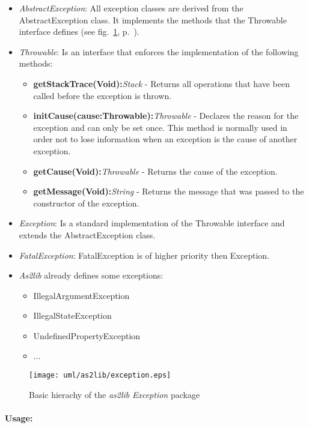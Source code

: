 \begin{itemize}
	\item \emph{AbstractException}: All exception classes are derived from the AbstractException class. It implements the methods that the Throwable interface defines (see fig.\ \ref{fig:exception}, p.\ \pageref{fig:exception}).
	\item \emph{Throwable}: Is an interface that enforces the implementation of the following methods:
		\begin{itemize}
			\item \textbf{getStackTrace(Void):}\textit{Stack} - Returns all operations that have been called before the exception is thrown.
			\item \textbf{initCause(cause:Throwable):}\textit{Throwable} - Declares the reason for the exception and can only be set once. This method is normally used in order not to lose information when an exception is the cause of another exception.
			\item \textbf{getCause(Void):}\textit{Throwable} - Returns the cause of the exception.
			\item \textbf{getMessage(Void):}\textit{String} - Returns the message that was passed to the constructor of the exception.
		\end{itemize}
	\item \emph{Exception}: Is a standard implementation of the Throwable interface and extends the AbstractException class.
	\item \emph{FatalException}: FatalException is of higher priority then Exception.
	\item {\sl As2lib} already defines some exceptions:
	\begin{itemize}
		\item IllegalArgumentException
		\item IllegalStateException
		\item UndefinedPropertyException
		\item ...
	\end{itemize}
\end{itemize}

\begin{figure}[!ht]
\begin{center}
\texttt{[image: uml/as2lib/exception.eps]}
\caption{Basic hierachy of the {\sl as2lib} \emph{Exception} package}
\label{fig:exception}
\end{center}
\end{figure}

\paragraph{Usage:}

